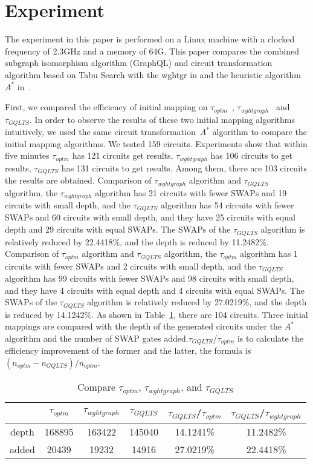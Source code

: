 \documentclass[runningheads]{llncs}
\begin{document}
\section{Experiment}
\label{Experiment}
The experiment in this paper is performed on a Linux machine with a clocked frequency of 2.3GHz 
and a memory of 64G. This paper compares the combined subgraph isomorphism algorithm (GraphQL) 
and circuit transformation algorithm based on Tabu Search
with the wghtgr in \cite{2020Qubit} and the heuristic algorithm $ A^{*}$  in~\cite{Zulehner2017}.
 
First, we compared the efficiency of initial mapping on $\tau_{optm}$~\cite{Zulehner2017}, $\tau_{wghtgraph}$~\cite{2020Qubit} and $\tau_{GQLTS}$.
In order to observe the results of these two initial mapping algorithms intuitively, 
we used the same circuit transformation~\cite{Zulehner2017}$ A^{*}$ algorithm to compare the initial mapping algorithms.
We tested 159 circuits. 
Experiments show that within five minutes $\tau_{optm}$ has 121 circuits get results, 
$\tau_{wghtgraph}$ has 106 circuits to get results, $\tau_{GQLTS}$ has 131 circuits to get results.
Among them, there are 103 circuits the results are obtained.
Comparison of $\tau_{wghtgraph}$ algorithm and $\tau_{GQLTS}$ algorithm, the $\tau_{wghtgraph}$ algorithm has 21 circuits with fewer SWAPs and 19 circuits with small depth,
and the $\tau_{GQLTS}$ algorithm has 54 circuits with fewer SWAPs and 60 circuits with small depth, 
and they have 25 circuits with equal depth and  29 circuits with equal SWAPs. 
The SWAPs of the $\tau_{GQLTS}$ algorithm is relatively reduced by 22.4418\%, and the depth is reduced by 11.2482\%.
Comparison of $\tau_{optm}$ algorithm and $\tau_{GQLTS}$ algorithm, the $\tau_{optm}$ algorithm has 1 circuits with fewer SWAPs and 2 circuits with small depth,
and the $\tau_{GQLTS}$ algorithm has 99 circuits with fewer SWAPs and 98 circuits with small depth, 
and they have 4 circuits with equal depth and  4 circuits with equal SWAPs.
The SWAPs of the $\tau_{GQLTS}$ algorithm is relatively reduced by 27.0219\%, and the depth is reduced by 14.1242\%.
As shown in Table~\ref{tab1}, there are 104 circuits. 
Three initial mappings are compared with the depth of the generated circuits under the $A^{*}$ algorithm 
and the number of SWAP gates added.$\tau_{GQLTS}$/$\tau_{optm}$ is to calculate the efficiency improvement
 of the former and the latter, the formula is $(n_{optm}-n_{GQLTS})/n_{optm}$.
\begin{table}
	\begin{center}  
	\begin{tabular}{|c|c|c|c|c|c|}
	\hline
	    	&  $\tau_{optm}$ & $\tau_{wghtgraph}$ &$\tau_{GQLTS}$& $\tau_{GQLTS}$/$\tau_{optm}$ & $\tau_{GQLTS}$/$\tau_{wghtgraph}$\\
	\hline
	 depth 	 &	168895	&   163422	&  145040 	& 14.1241\%  &11.2482\%   \\
	\hline
	 added 	&	20439	&  19232 	&  14916 & 27.0219\% 	&  22.4418\%  \\
	\hline
	\end{tabular} 
	\end{center} 
	\caption{Compare $\tau_{optm}$, $\tau_{wghtgraph}$, and $\tau_{GQLTS}$ }
	\label{tab1}
	\end{table}
\end{document}
